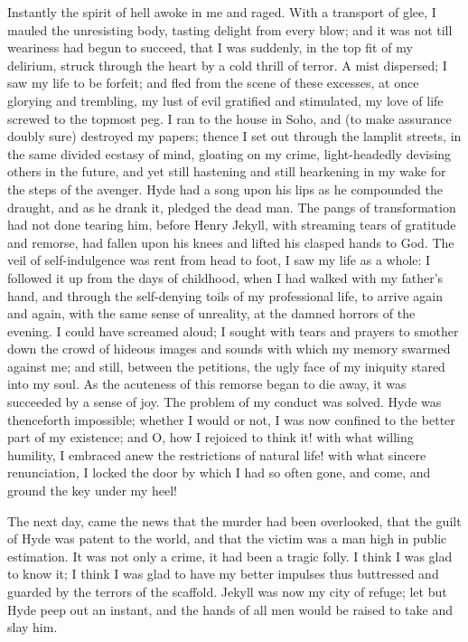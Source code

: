 \documentclass[]{novel}
\begin{document}
Instantly the spirit of hell awoke in me and raged. With a transport of glee, I mauled the unresisting body, tasting delight from every blow; and it was not till weariness had begun to succeed, that I was suddenly, in the top fit of my delirium, struck through the heart by a cold thrill of terror. A mist dispersed; I saw my life to be forfeit; and fled from the scene of these excesses, at once glorying and trembling, my lust of evil gratified and stimulated, my love of life screwed to the topmost peg. I ran to the house in Soho, and (to make assurance doubly sure) destroyed my papers; thence I set out through the lamplit streets, in the same divided ecstasy of mind, gloating on my crime, light-headedly devising others in the future, and yet still hastening and still hearkening in my wake for the steps of the avenger. Hyde had a song upon his lips as he compounded the draught, and as he drank it, pledged the dead man. The pangs of transformation had not done tearing him, before Henry Jekyll, with streaming tears of gratitude and remorse, had fallen upon his knees and lifted his clasped hands to God. The veil of self-indulgence was rent from head to foot, I saw my life as a whole: I followed it up from the days of childhood, when I had walked with my father's hand, and through the self-denying toils of my professional life, to arrive again and again, with the same sense of unreality, at the damned horrors of the evening. I could have screamed aloud; I sought with tears and prayers to smother down the crowd of hideous images and sounds with which my memory swarmed against me; and still, between the petitions, the ugly face of my iniquity stared into my soul. As the acuteness of this remorse began to die away, it was succeeded by a sense of joy. The problem of my conduct was solved. Hyde was thenceforth impossible; whether I would or not, I was now confined to the better part of my existence; and O, how I rejoiced to think it! with what willing humility, I embraced anew the restrictions of natural life! with what sincere renunciation, I locked the door by which I had so often gone, and come, and ground the key under my heel!

The next day, came the news that the murder had been overlooked, that the guilt of Hyde was patent to the world, and that the victim was a man high in public estimation. It was not only a crime, it had been a tragic folly. I think I was glad to know it; I think I was glad to have my better impulses thus buttressed and guarded by the terrors of the scaffold. Jekyll was now my city of refuge; let but Hyde peep out an instant, and the hands of all men would be raised to take and slay him.
\end{document}

